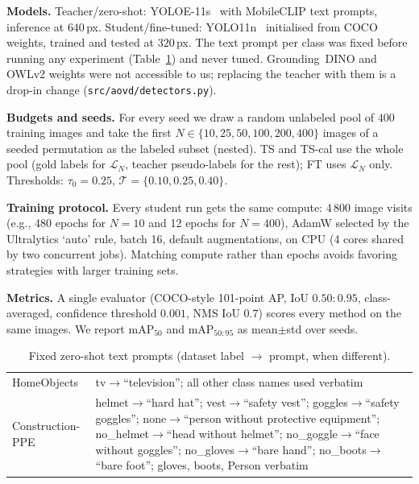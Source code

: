 \textbf{Models.} Teacher/zero-shot: YOLOE-11s~\cite{wang2025yoloe} with MobileCLIP text prompts, inference at $640$\,px. Student/fine-tuned: YOLO11n~\cite{jocher2024yolo11} initialised from COCO~\cite{lin2014coco} weights, trained and tested at $320$\,px. The text prompt per class was fixed before running any experiment (Table~\ref{tab:prompts}) and never tuned. Grounding~DINO and OWLv2 weights were not accessible to us; replacing the teacher with them is a drop-in change (\texttt{src/aovd/detectors.py}).

\textbf{Budgets and seeds.} For every seed we draw a random unlabeled pool of $400$ training images and take the first $N\in\{10,25,50,100,200,400\}$ images of a seeded permutation as the labeled subset (nested). TS and TS-cal use the whole pool (gold labels for $\mathcal{L}_N$, teacher pseudo-labels for the rest); FT uses $\mathcal{L}_N$ only. Thresholds: $\tau_0=0.25$, $\mathcal{T}=\{0.10,0.25,0.40\}$.

\textbf{Training protocol.} Every student run gets the same compute: 4\,800 image visits (e.g., 480 epochs for $N{=}10$ and 12 epochs for $N{=}400$), AdamW selected by the Ultralytics `auto' rule, batch 16, default augmentations, on CPU (4 cores shared by two concurrent jobs). Matching compute rather than epochs avoids favoring strategies with larger training sets.

\textbf{Metrics.} A single evaluator (COCO-style 101-point AP, IoU $0.50{:}0.95$, class-averaged, confidence threshold $0.001$, NMS IoU $0.7$) scores every method on the same images. We report mAP$_{50}$ and mAP$_{50:95}$ as mean$\pm$std over seeds.

\begin{table}[t]
\caption{Fixed zero-shot text prompts (dataset label $\rightarrow$ prompt, when different).}
\label{tab:prompts}
\centering\footnotesize
\begin{tabular}{p{0.9in}p{2.3in}}
\toprule
HomeObjects & tv$\rightarrow$``television''; all other class names used verbatim\\
Construction-PPE & helmet$\rightarrow$``hard hat''; vest$\rightarrow$``safety vest''; goggles$\rightarrow$``safety goggles''; none$\rightarrow$``person without protective equipment''; no\_helmet$\rightarrow$``head without helmet''; no\_goggle$\rightarrow$``face without goggles''; no\_gloves$\rightarrow$``bare hand''; no\_boots$\rightarrow$``bare foot''; gloves, boots, Person verbatim\\
\bottomrule
\end{tabular}
\end{table}
